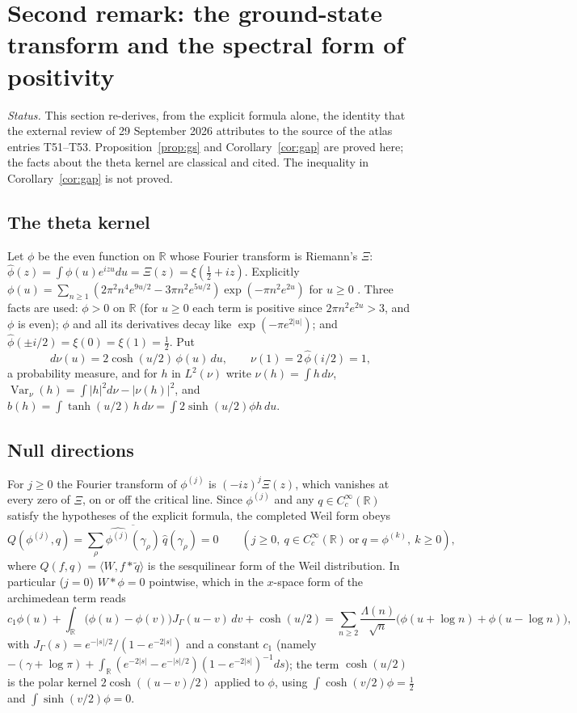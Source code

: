 \documentclass[11pt]{article}
\theoremstyle{definition}
\theoremstyle{remark}
\newcommand{\R}{\mathbb{R}}
\begin{document}
\section*{Second remark: the ground-state transform and the spectral form of positivity}

\noindent\emph{Status.} This section re-derives, from the explicit formula alone, the identity that the external review of 29 September 2026 attributes to the source of the atlas entries T51--T53. Proposition~\ref{prop:gs} and Corollary~\ref{cor:gap} are proved here; the facts about the theta kernel are classical and cited. The inequality in Corollary~\ref{cor:gap} is not proved.

\subsection*{The theta kernel}
Let $\phi$ be the even function on $\R$ whose Fourier transform is Riemann's $\Xi$: $\widehat\phi(z)=\int\phi(u)e^{izu}du=\Xi(z)=\xi(\tfrac12+iz)$. Explicitly $\phi(u)=\sum_{n\ge1}(2\pi^2n^4e^{9u/2}-3\pi n^2e^{5u/2})\exp(-\pi n^2e^{2u})$ for $u\ge0$ \cite[\S10.1]{titchmarsh}. Three facts are used: $\phi>0$ on $\R$ (for $u\ge0$ each term is positive since $2\pi n^2e^{2u}>3$, and $\phi$ is even); $\phi$ and all its derivatives decay like $\exp(-\pi e^{2|u|})$; and $\widehat\phi(\pm i/2)=\xi(0)=\xi(1)=\tfrac12$. Put
\[
d\nu(u)=2\cosh(u/2)\,\phi(u)\,du,\qquad \nu(1)=2\,\widehat\phi(i/2)=1,
\]
a probability measure, and for $h$ in $L^2(\nu)$ write $\nu(h)=\int h\,d\nu$, $\operatorname{Var}_\nu(h)=\int|h|^2d\nu-|\nu(h)|^2$, and $b(h)=\int\tanh(u/2)\,h\,d\nu=\int2\sinh(u/2)\phi h\,du$.

\subsection*{Null directions}
For $j\ge0$ the Fourier transform of $\phi^{(j)}$ is $(-iz)^j\Xi(z)$, which vanishes at every zero of $\Xi$, on or off the critical line. Since $\phi^{(j)}$ and any $q\in C_c^\infty(\R)$ satisfy the hypotheses of the explicit formula, the completed Weil form obeys
\begin{equation}\label{eq:null}
Q(\phi^{(j)},q)=\sum_\rho\overline{\widehat{\phi^{(j)}}(\gamma_\rho)}\,\widehat q(\gamma_\rho)=0\qquad(j\ge0,\ q\in C_c^\infty(\R)\ \text{or}\ q=\phi^{(k)},\ k\ge0),
\end{equation}
where $Q(f,q)=\langle W,f*\tilde q\rangle$ is the sesquilinear form of the Weil distribution. In particular ($j=0$) $W*\phi=0$ pointwise, which in the $x$-space form of the archimedean term reads
\begin{equation}\label{eq:gseq}
c_1\phi(u)+\int_\R\big(\phi(u)-\phi(v)\big)J_\Gamma(u-v)\,dv+\cosh(u/2)=\sum_{n\ge2}\frac{\Lambda(n)}{\sqrt n}\big(\phi(u+\log n)+\phi(u-\log n)\big),
\end{equation}
with $J_\Gamma(s)=e^{-|s|/2}/(1-e^{-2|s|})$ and a constant $c_1$ (namely $-(\gamma+\log\pi)+\int_\R(e^{-2|s|}-e^{-|s|/2})(1-e^{-2|s|})^{-1}ds$); the term $\cosh(u/2)$ is the polar kernel $2\cosh((u-v)/2)$ applied to $\phi$, using $\int\cosh(v/2)\phi=\tfrac12$ and $\int\sinh(v/2)\phi=0$.
\end{document}
